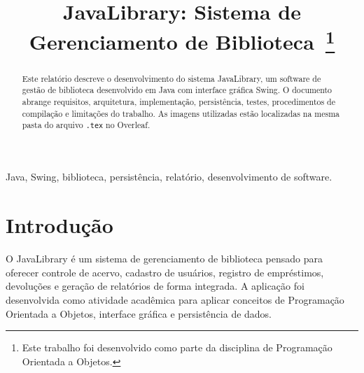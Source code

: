 \documentclass[conference]{IEEEtran}
\begin{document}
\title{JavaLibrary: Sistema de Gerenciamento de Biblioteca\
\thanks{Este trabalho foi desenvolvido como parte da disciplina de Programação Orientada a Objetos.}
}

\author{
\and
{}
}

\maketitle

\begin{abstract}
Este relatório descreve o desenvolvimento do sistema JavaLibrary, um software de gestão de biblioteca desenvolvido em Java com interface gráfica Swing. O documento abrange requisitos, arquitetura, implementação, persistência, testes, procedimentos de compilação e limitações do trabalho. As imagens utilizadas estão localizadas na mesma pasta do arquivo \texttt{.tex} no Overleaf.
\end{abstract}

\begin{IEEEkeywords}
Java, Swing, biblioteca, persistência, relatório, desenvolvimento de software.
\end{IEEEkeywords}

\section{Introdução}
O JavaLibrary é um sistema de gerenciamento de biblioteca pensado para oferecer controle de acervo, cadastro de usuários, registro de empréstimos, devoluções e geração de relatórios de forma integrada. A aplicação foi desenvolvida como atividade acadêmica para aplicar conceitos de Programação Orientada a Objetos, interface gráfica e persistência de dados.
\end{document}

